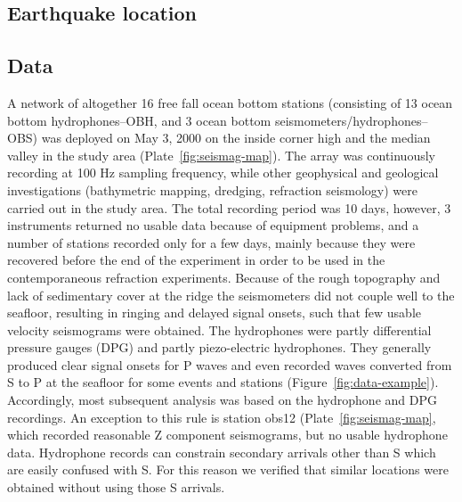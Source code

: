 \documentclass[aguplus]{aguplus}
\newlength{\tw}
\begin{document}
\begin{article}
\section{Earthquake location}

\subsection{Data}

A network of altogether 16 free fall ocean bottom stations (consisting
of 13 ocean bottom hydro\-phones--OBH, and 3 ocean bottom seismometers/hydro\-phones--OBS) was deployed
on May 3, 2000 on the inside corner high and the median valley in the
study area (Plate~\ref{fig:seismag-map}).  The array was continuously recording at 100 Hz sampling frequency, while other
geophysical and geological investigations (bathymetric mapping,
dredging, refraction seismology) were carried out in the study area.
The total recording period was 10 days, however, 3 instruments
returned no usable data because of equipment problems, and a number of
stations recorded only for a few days, mainly because they were
recovered before the end of the experiment in order to be used in the
contemporaneous refraction experiments.  Because of the rough
topography and lack of sedimentary cover at the ridge the seismometers
did not couple well to the seafloor, resulting in ringing and delayed
signal onsets, such that few usable velocity seismograms were
obtained.  The hydrophones were partly differential pressure gauges
(DPG) and partly piezo-electric hydrophones.
They generally produced clear signal onsets for
P waves and even recorded waves converted from S to P at the seafloor
for some events and stations
(Figure~\ref{fig:data-example}). Accordingly, most subsequent analysis
was based on the hydrophone and DPG recordings.  An
exception to this rule is station obs12 (Plate~\ref{fig:seismag-map}, which recorded reasonable Z
component seismograms, but no usable hydrophone data.  Hydrophone
records can constrain secondary arrivals other than S which are easily
confused with S.  For this reason we verified that similar locations
were obtained without using those S arrivals.


\end{article}
\end{document}
